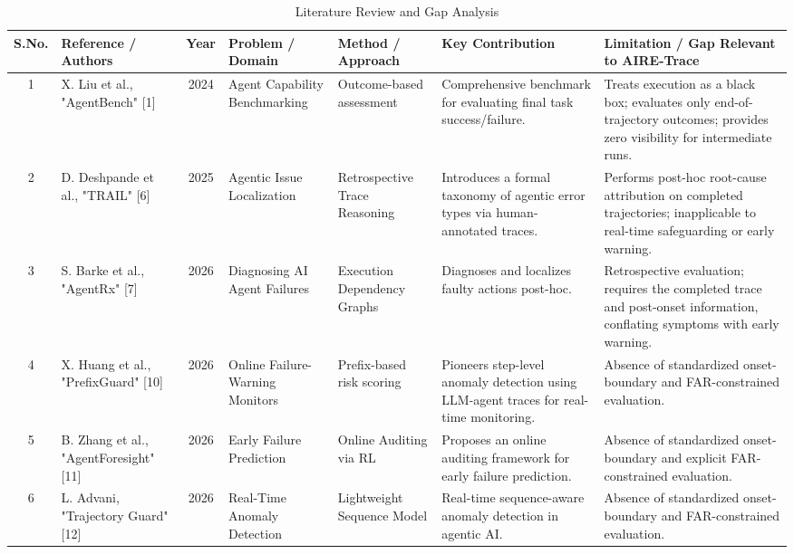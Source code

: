 \documentclass[12pt,a4paper]{article}
\begin{document}
\begin{table}[H]
\centering
\scriptsize
\begin{tabularx}{\textwidth}{@{} c p{2.2cm} c p{2.0cm} p{2.2cm} >{\raggedright\arraybackslash}X >{\raggedright\arraybackslash}X @{}}
\toprule
\textbf{S.No.} & \textbf{Reference / Authors} & \textbf{Year} & \textbf{Problem / Domain} & \textbf{Method / Approach} & \textbf{Key Contribution} & \textbf{Limitation / Gap Relevant to AIRE-Trace} \\
\midrule
1 & X. Liu et al., "AgentBench" [1] & 2024 & Agent Capability Benchmarking & Outcome-based assessment & Comprehensive benchmark for evaluating final task success/failure. & Treats execution as a black box; evaluates only end-of-trajectory outcomes; provides zero visibility for intermediate runs. \\
2 & D. Deshpande et al., "TRAIL" [6] & 2025 & Agentic Issue Localization & Retrospective Trace Reasoning & Introduces a formal taxonomy of agentic error types via human-annotated traces. & Performs post-hoc root-cause attribution on completed trajectories; inapplicable to real-time safeguarding or early warning. \\
3 & S. Barke et al., "AgentRx" [7] & 2026 & Diagnosing AI Agent Failures & Execution Dependency Graphs & Diagnoses and localizes faulty actions post-hoc. & Retrospective evaluation; requires the completed trace and post-onset information, conflating symptoms with early warning. \\
4 & X. Huang et al., "PrefixGuard" [10] & 2026 & Online Failure-Warning Monitors & Prefix-based risk scoring & Pioneers step-level anomaly detection using LLM-agent traces for real-time monitoring. & Absence of standardized onset-boundary and FAR-constrained evaluation. \\
5 & B. Zhang et al., "AgentForesight" [11] & 2026 & Early Failure Prediction & Online Auditing via RL & Proposes an online auditing framework for early failure prediction. & Absence of standardized onset-boundary and explicit FAR-constrained evaluation. \\
6 & L. Advani, "Trajectory Guard" [12] & 2026 & Real-Time Anomaly Detection & Lightweight Sequence Model & Real-time sequence-aware anomaly detection in agentic AI. & Absence of standardized onset-boundary and FAR-constrained evaluation. \\
\bottomrule
\end{tabularx}
\caption{Literature Review and Gap Analysis}
\end{table}
\end{document}
